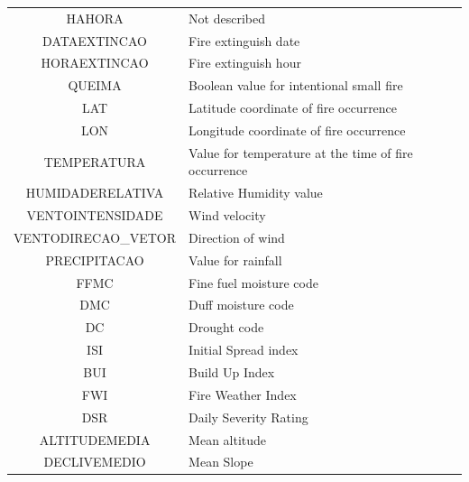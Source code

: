\begin{table}[H]
\begin{tabular}{cp{8.5cm}}
		HAHORA & Not described \\
		DATAEXTINCAO & Fire extinguish date \\
		HORAEXTINCAO & Fire extinguish hour \\
		QUEIMA & Boolean value for intentional small fire\\
		LAT & Latitude coordinate of fire occurrence\\
		LON & Longitude coordinate of fire occurrence\\
		TEMPERATURA & Value for temperature at the time of fire occurrence\\
		HUMIDADERELATIVA & Relative Humidity value\\
		VENTOINTENSIDADE & Wind velocity\\
		VENTODIRECAO\_VETOR & Direction of wind\\
		PRECIPITACAO & Value for rainfall\\
		FFMC & Fine fuel moisture code\\
		DMC & Duff moisture code\\
		DC & Drought code\\
		ISI & Initial Spread index\\
		BUI & Build Up Index\\
		FWI & Fire Weather Index\\
		DSR & Daily Severity Rating\\
		ALTITUDEMEDIA & Mean altitude\\
		DECLIVEMEDIO & Mean Slope\\
		\hline
	\end{tabular}
\end{table}

